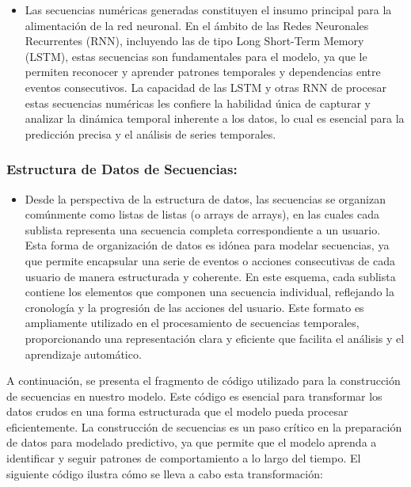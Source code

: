 \begin{itemize}
    \item Las secuencias numéricas generadas constituyen el insumo principal para la alimentación de la red neuronal. En el ámbito de las Redes Neuronales Recurrentes (RNN), incluyendo las de tipo Long Short-Term Memory (LSTM), estas secuencias son fundamentales para el modelo, ya que le permiten reconocer y aprender patrones temporales y dependencias entre eventos consecutivos. La capacidad de las LSTM y otras RNN de procesar estas secuencias numéricas les confiere la habilidad única de capturar y analizar la dinámica temporal inherente a los datos, lo cual es esencial para la predicción precisa y el análisis de series temporales.
\end{itemize}

\subsubsection{Estructura de Datos de Secuencias:}

\begin{itemize}
    \item Desde la perspectiva de la estructura de datos, las secuencias se organizan comúnmente como listas de listas (o arrays de arrays), en las cuales cada sublista representa una secuencia completa correspondiente a un usuario. Esta forma de organización de datos es idónea para modelar secuencias, ya que permite encapsular una serie de eventos o acciones consecutivas de cada usuario de manera estructurada y coherente. En este esquema, cada sublista contiene los elementos que componen una secuencia individual, reflejando la cronología y la progresión de las acciones del usuario. Este formato es ampliamente utilizado en el procesamiento de secuencias temporales, proporcionando una representación clara y eficiente que facilita el análisis y el aprendizaje automático.
\end{itemize}

A continuación, se presenta el fragmento de código utilizado para la construcción de secuencias en nuestro modelo. Este código es esencial para transformar los datos crudos en una forma estructurada que el modelo pueda procesar eficientemente. La construcción de secuencias es un paso crítico en la preparación de datos para modelado predictivo, ya que permite que el modelo aprenda a identificar y seguir patrones de comportamiento a lo largo del tiempo. El siguiente código ilustra cómo se lleva a cabo esta transformación:

